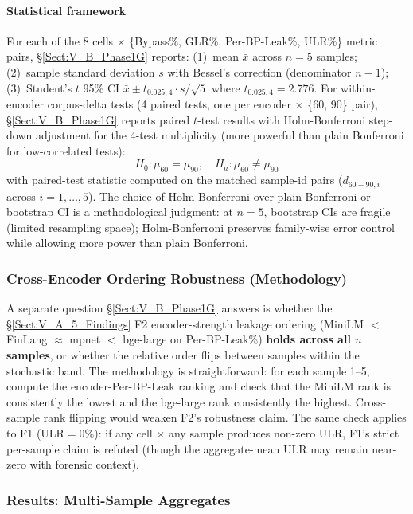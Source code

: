 \documentclass[journal]{IEEEtran}
\begin{document}
\paragraph{Statistical framework}
For each of the 8 cells $\times$ \{Bypass\%, GLR\%, Per-BP-Leak\%, ULR\%\} metric pairs, \S\ref{Sect:V_B_Phase1G} reports: (1)~mean $\bar{x}$ across $n{=}5$ samples; (2)~sample standard deviation $s$ with Bessel's correction (denominator $n{-}1$); (3)~Student's $t$ 95\% CI $\bar{x} \pm t_{0.025,4} \cdot s/\sqrt{5}$ where $t_{0.025,4}{=}2.776$. For within-encoder corpus-delta tests (4 paired tests, one per encoder $\times$ \{60, 90\} pair), \S\ref{Sect:V_B_Phase1G} reports paired $t$-test results with Holm-Bonferroni step-down adjustment for the 4-test multiplicity (more powerful than plain Bonferroni for low-correlated tests):
\begin{equation}
H_0: \mu_{60} = \mu_{90}, \quad H_a: \mu_{60} \neq \mu_{90}
\label{eq:paired_test_h0}
\end{equation}
with paired-test statistic computed on the matched sample-id pairs ($\bar{d}_{60-90, i}$ across $i{=}1, \ldots, 5$). The choice of Holm-Bonferroni over plain Bonferroni or bootstrap CI is a methodological judgment: at $n{=}5$, bootstrap CIs are fragile (limited resampling space); Holm-Bonferroni preserves family-wise error control while allowing more power than plain Bonferroni.

\subsubsection{Cross-Encoder Ordering Robustness (Methodology)}
\label{Sect:V_B_3_Ordering}

A separate question \S\ref{Sect:V_B_Phase1G} answers is whether the \S\ref{Sect:V_A_5_Findings} F2 encoder-strength leakage ordering (MiniLM $<$ FinLang $\approx$ mpnet $<$ bge-large on Per-BP-Leak\%) \textbf{holds across all $n$ samples}, or whether the relative order flips between samples within the stochastic band. The methodology is straightforward: for each sample 1--5, compute the encoder-Per-BP-Leak ranking and check that the MiniLM rank is consistently the lowest and the bge-large rank consistently the highest. Cross-sample rank flipping would weaken F2's robustness claim. The same check applies to F1 (ULR$={}$0\%): if any cell $\times$ any sample produces non-zero ULR, F1's strict per-sample claim is refuted (though the aggregate-mean ULR may remain near-zero with forensic context).

\subsubsection{Results: Multi-Sample Aggregates}
\label{Sect:V_B_4_Results}
\end{document}
